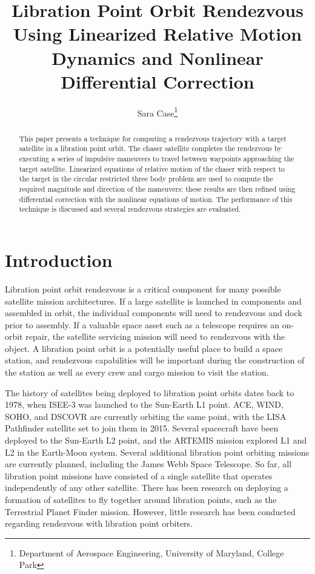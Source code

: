 \documentclass[letterpaper, preprint, paper,11pt]{AAS}	%
\begin{document}
\title{Libration Point Orbit Rendezvous Using Linearized Relative Motion Dynamics and Nonlinear Differential Correction}

\author{Sara Case\thanks{Department of Aerospace Engineering, University of Maryland, College Park}}

\maketitle{} 		

\begin{abstract}
This paper presents a technique for computing a rendezvous trajectory with a target satellite in a libration point orbit.  The chaser satellite completes the rendezvous by executing a series of impulsive maneuvers to travel between waypoints approaching the target satellite.  Linearized equations of relative motion of the chaser with respect to the target in the circular restricted three body problem are used to compute the required magnitude and direction of the maneuvers; these results are then refined using differential correction with the nonlinear equations of motion. The performance of this technique is discussed and several rendezvous strategies are evaluated.
\end{abstract}

\section{Introduction}
Libration point orbit rendezvous is a critical component for many possible satellite mission architectures.  If a large satellite is launched in components and assembled in orbit, the individual components will need to rendezvous and dock prior to assembly.  If a valuable space asset such as a telescope requires an on-orbit repair, the satellite servicing mission will need to rendezvous with the object.  A libration point orbit is a potentially useful place to build a space station, and rendezvous capabilities will be important during the construction of the station as well as every crew and cargo mission to visit the station.

The history of satellites being deployed to libration point orbits dates back to 1978, when ISEE-3 was launched to the Sun-Earth L1 point. ACE, WIND, SOHO, and DSCOVR are currently orbiting the same point, with the LISA Pathfinder satellite set to join them in 2015.  Several spacecraft have been deployed to the Sun-Earth L2 point, and the ARTEMIS mission explored L1 and L2 in the Earth-Moon system.  Several additional libration point orbiting missions are currently planned, including the James Webb Space Telescope.  So far, all libration point missions have consisted of a single satellite that operates independently of any other satellite.  There has been research on deploying a formation of satellites to fly together around libration points, such as the Terrestrial Planet Finder mission.\cite{beichman2004}  However, little research has been conducted regarding rendezvous with libration point orbiters. %
\end{document}
